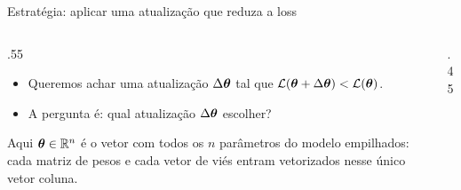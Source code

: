 \documentclass[aspectratio=169,xcolor=dvipsnames]{beamer}
\begin{document}
  \begin{frame}{Estratégia: aplicar uma atualização que reduza a loss}
    \begin{columns}
      \begin{column}{.55\linewidth}
        \begin{itemize}
          \item Queremos achar uma atualização $\Delta\bm{\theta}$ tal que
            $\mathcal{L}(\bm{\theta}+\Delta\bm{\theta}) < \mathcal{L}(\bm{\theta})$.
          \item A pergunta é: \alert{qual atualização $\Delta\bm{\theta}$ escolher?}
        \end{itemize}
        \vspace{.5em}
        {\footnotesize\color{gray!50!black}Aqui $\bm{\theta}\in\mathbb{R}^{n}$ é o vetor com todos os $n$ parâmetros do modelo empilhados: cada matriz de pesos e cada vetor de viés entram vetorizados nesse único vetor coluna.}
      \end{column}
      \begin{column}{.45\linewidth}
        \centering
      \end{column}
    \end{columns}
  \end{frame}
\end{document}
